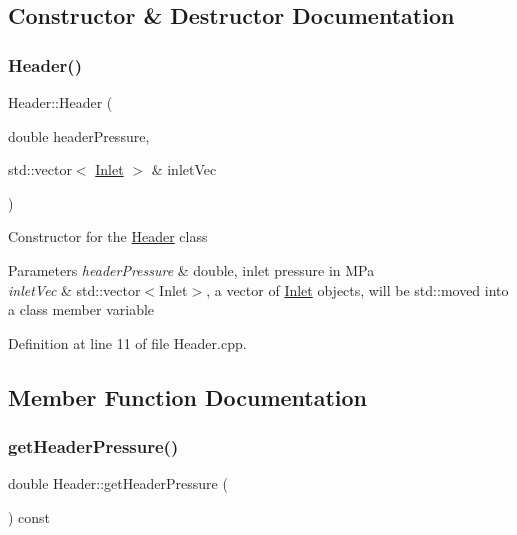 \subsection{Constructor \& Destructor Documentation}
\mbox{\label{class_header_a59b836abde0be58bec65ebea1ac67a3b}} 
\subsubsection{\texorpdfstring{Header()}{Header()}}
{\footnotesize\ttfamily Header\+::\+Header (\begin{DoxyParamCaption}\item[{double}]{header\+Pressure,  }\item[{std\+::vector$<$ \hyperlink{class_inlet}{Inlet} $>$ \&}]{inlet\+Vec }\end{DoxyParamCaption})}

Constructor for the \hyperlink{class_header}{Header} class


\begin{DoxyParams}{Parameters}
{\em header\+Pressure} & double, inlet pressure in M\+Pa \\
\hline
{\em inlet\+Vec} & std\+::vector$<$\+Inlet$>$, a vector of \hyperlink{class_inlet}{Inlet} objects, will be std\+::moved into a class member variable \\
\hline
\end{DoxyParams}


Definition at line 11 of file Header.\+cpp.



\subsection{Member Function Documentation}
\mbox{\label{class_header_adc2e6daaf9f5e633c3db96ff3990f1f6}} 
\subsubsection{\texorpdfstring{get\+Header\+Pressure()}{getHeaderPressure()}}
{\footnotesize\ttfamily double Header\+::get\+Header\+Pressure (\begin{DoxyParamCaption}{ }\end{DoxyParamCaption}) const\hspace{0.3cm}{\ttfamily [inline]}}

